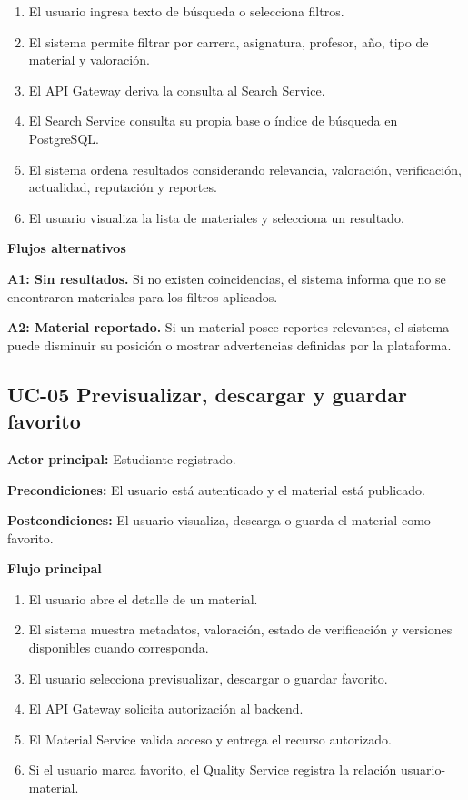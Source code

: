 \documentclass[12pt,a4paper]{article}
\begin{document}
\begin{enumerate}
    \item El usuario ingresa texto de búsqueda o selecciona filtros.
    \item El sistema permite filtrar por carrera, asignatura, profesor, año, tipo de material y valoración.
    \item El API Gateway deriva la consulta al Search Service.
    \item El Search Service consulta su propia base o índice de búsqueda en PostgreSQL.
    \item El sistema ordena resultados considerando relevancia, valoración, verificación, actualidad, reputación y reportes.
    \item El usuario visualiza la lista de materiales y selecciona un resultado.
\end{enumerate}

\noindent\textbf{Flujos alternativos}

\noindent\textbf{A1: Sin resultados.} Si no existen coincidencias, el sistema informa que no se encontraron materiales para los filtros aplicados.

\noindent\textbf{A2: Material reportado.} Si un material posee reportes relevantes, el sistema puede disminuir su posición o mostrar advertencias definidas por la plataforma.

\subsection{UC-05 Previsualizar, descargar y guardar favorito}

\noindent\textbf{Actor principal:} Estudiante registrado.

\noindent\textbf{Precondiciones:} El usuario está autenticado y el material está publicado.

\noindent\textbf{Postcondiciones:} El usuario visualiza, descarga o guarda el material como favorito.

\noindent\textbf{Flujo principal}

\begin{enumerate}
    \item El usuario abre el detalle de un material.
    \item El sistema muestra metadatos, valoración, estado de verificación y versiones disponibles cuando corresponda.
    \item El usuario selecciona previsualizar, descargar o guardar favorito.
    \item El API Gateway solicita autorización al backend.
    \item El Material Service valida acceso y entrega el recurso autorizado.
    \item Si el usuario marca favorito, el Quality Service registra la relación usuario-material.
\end{enumerate}
\end{document}

